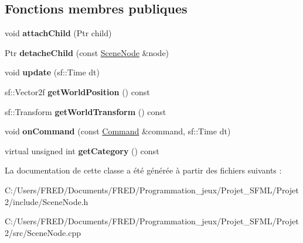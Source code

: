 \subsection*{Fonctions membres publiques}
\begin{DoxyCompactItemize}
\item 
void {\bfseries attach\+Child} (Ptr child)\hypertarget{class_scene_node_acdfa2c2ba28bce076c886eaba2d9e650}{}\label{class_scene_node_acdfa2c2ba28bce076c886eaba2d9e650}

\item 
Ptr {\bfseries detache\+Child} (const \hyperlink{class_scene_node}{Scene\+Node} \&node)\hypertarget{class_scene_node_a96fce79b962e56cf269a905c52daeb49}{}\label{class_scene_node_a96fce79b962e56cf269a905c52daeb49}

\item 
void {\bfseries update} (sf\+::\+Time dt)\hypertarget{class_scene_node_a132fa45a0a23ba86b76247273a16cfce}{}\label{class_scene_node_a132fa45a0a23ba86b76247273a16cfce}

\item 
sf\+::\+Vector2f {\bfseries get\+World\+Position} () const \hypertarget{class_scene_node_a410150636d06294c7a9e238d8c4f07b5}{}\label{class_scene_node_a410150636d06294c7a9e238d8c4f07b5}

\item 
sf\+::\+Transform {\bfseries get\+World\+Transform} () const \hypertarget{class_scene_node_a88be3d3c93c80ee4a7ba25024d2414ec}{}\label{class_scene_node_a88be3d3c93c80ee4a7ba25024d2414ec}

\item 
void {\bfseries on\+Command} (const \hyperlink{struct_command}{Command} \&command, sf\+::\+Time dt)\hypertarget{class_scene_node_af6f126fe8727414a0c967f84f9754968}{}\label{class_scene_node_af6f126fe8727414a0c967f84f9754968}

\item 
virtual unsigned int {\bfseries get\+Category} () const \hypertarget{class_scene_node_a46b4d2304c0e3e8e18235959f51689d9}{}\label{class_scene_node_a46b4d2304c0e3e8e18235959f51689d9}

\end{DoxyCompactItemize}


La documentation de cette classe a été générée à partir des fichiers suivants \+:\begin{DoxyCompactItemize}
\item 
C\+:/\+Users/\+F\+R\+E\+D/\+Documents/\+F\+R\+E\+D/\+Programmation\+\_\+jeux/\+Projet\+\_\+\+S\+F\+M\+L/\+Projet2/include/Scene\+Node.\+h\item 
C\+:/\+Users/\+F\+R\+E\+D/\+Documents/\+F\+R\+E\+D/\+Programmation\+\_\+jeux/\+Projet\+\_\+\+S\+F\+M\+L/\+Projet2/src/Scene\+Node.\+cpp\end{DoxyCompactItemize}
